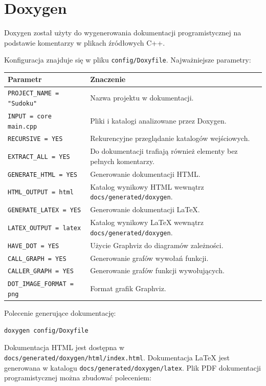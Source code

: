 \documentclass[12pt,a4paper]{article}
\begin{document}
\section{Doxygen}

Doxygen został użyty do wygenerowania dokumentacji programistycznej na podstawie
komentarzy w plikach źródłowych C++.

Konfiguracja znajduje się w pliku \texttt{config/Doxyfile}. Najważniejsze parametry:

\begin{longtable}{p{}p{}}
\textbf{Parametr} & \textbf{Znaczenie} \\
\hline
\texttt{PROJECT\_NAME = "Sudoku"} & Nazwa projektu w dokumentacji. \\
\texttt{INPUT = core main.cpp} & Pliki i katalogi analizowane przez Doxygen. \\
\texttt{RECURSIVE = YES} & Rekurencyjne przeglądanie katalogów wejściowych. \\
\texttt{EXTRACT\_ALL = YES} & Do dokumentacji trafiają również elementy bez pełnych komentarzy. \\
\texttt{GENERATE\_HTML = YES} & Generowanie dokumentacji HTML. \\
\texttt{HTML\_OUTPUT = html} & Katalog wynikowy HTML wewnątrz \texttt{docs/generated/doxygen}. \\
\texttt{GENERATE\_LATEX = YES} & Generowanie dokumentacji LaTeX. \\
\texttt{LATEX\_OUTPUT = latex} & Katalog wynikowy LaTeX wewnątrz \texttt{docs/generated/doxygen}. \\
\texttt{HAVE\_DOT = YES} & Użycie Graphviz do diagramów zależności. \\
\texttt{CALL\_GRAPH = YES} & Generowanie grafów wywołań funkcji. \\
\texttt{CALLER\_GRAPH = YES} & Generowanie grafów funkcji wywołujących. \\
\texttt{DOT\_IMAGE\_FORMAT = png} & Format grafik Graphviz. \\
\end{longtable}

Polecenie generujące dokumentację:

\begin{lstlisting}
doxygen config/Doxyfile
\end{lstlisting}

Dokumentacja HTML jest dostępna w \texttt{docs/generated/doxygen/html/index.html}. Dokumentacja LaTeX
jest generowana w katalogu \texttt{docs/generated/doxygen/latex}. Plik PDF dokumentacji programistycznej
można zbudować poleceniem:
\end{document}
